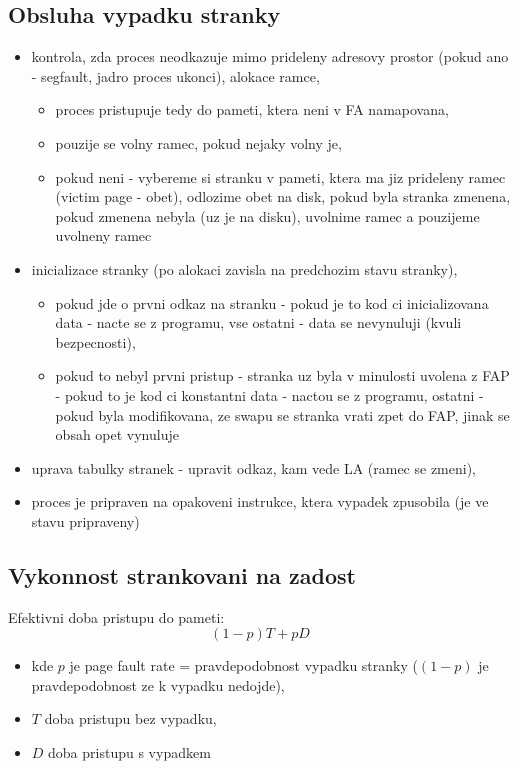 \documentclass[a4paper, 11pt]{article}
\begin{document}
\subsection{Obsluha vypadku stranky}
\begin{itemize}
    \item kontrola, zda proces neodkazuje mimo prideleny adresovy prostor (pokud ano - segfault, jadro proces ukonci),
alokace ramce,
\begin{itemize}
    \item proces pristupuje tedy do pameti, ktera neni v FA namapovana,
    \item pouzije se volny ramec, pokud nejaky volny je,
    \item pokud neni - vybereme si stranku v pameti, ktera ma jiz prideleny ramec (victim page - obet), odlozime obet na disk, pokud byla stranka zmenena, pokud zmenena nebyla (uz je na disku), uvolnime ramec a pouzijeme uvolneny ramec 
\end{itemize}
    \item inicializace stranky (po alokaci zavisla na predchozim stavu stranky),
    \begin{itemize}
        \item pokud jde o prvni odkaz na stranku - pokud je to kod ci inicializovana data - nacte se z programu, vse ostatni - data se nevynuluji (kvuli bezpecnosti),
        \item pokud to nebyl prvni pristup - stranka uz byla v minulosti uvolena z FAP - pokud to je kod ci konstantni data - nactou se z programu, ostatni - pokud byla modifikovana, ze swapu se stranka vrati zpet do FAP, jinak se obsah opet vynuluje
    \end{itemize}
    \item uprava tabulky stranek - upravit odkaz, kam vede LA (ramec se zmeni),
    \item proces je pripraven na opakoveni instrukce, ktera vypadek zpusobila (je ve stavu pripraveny) \\
\end{itemize}

\subsection{Vykonnost strankovani na zadost}
Efektivni doba pristupu do pameti:
$$(1 - p)T + pD$$

\begin{itemize}
    \item kde $p$ je page fault rate = pravdepodobnost vypadku stranky ($(1 - p)$ je pravdepodobnost ze k vypadku nedojde),
    \item $T$ doba pristupu bez vypadku,
    \item $D$ doba pristupu s vypadkem \\
\end{itemize}
\end{document}
